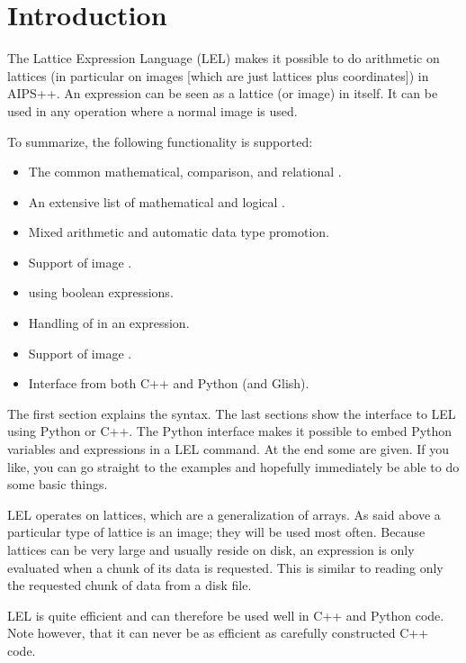 \section{Introduction}

The Lattice Expression Language (LEL) makes it possible to do arithmetic
on lattices (in particular on images [which are just lattices plus
coordinates]) in AIPS++.  An expression can be seen as a lattice (or
image) in itself.  It can be used in any operation where a normal image
is used. 

To summarize, the following functionality is supported:
\begin{itemize}
\item The common mathematical, comparison, and relational
      .
\item An extensive list of mathematical and logical
      .
\item Mixed  arithmetic
      and automatic data type promotion.
\item Support of image .
\item {} using boolean expressions.
\item Handling of  in an expression.
\item Support of image .
\item Interface from both C++ and Python (and Glish).
\end{itemize}

The first section explains the syntax.  The last sections show the
interface to LEL using Python or C++.  The Python interface makes it
possible to embed Python variables and expressions in a LEL command. 
At the end some  are given.  If 
you like, you can go straight to the examples and hopefully immediately
be able to do some basic things.

\medskip\noindent LEL operates on lattices, which are a generalization
of arrays.  As said above a particular type of lattice is an image; they
will be used most often.  Because lattices can be very large and
usually reside on disk, an
expression is only evaluated when a chunk of its data is requested. 
This is similar to reading only the requested chunk of data from a disk
file. 

\medskip\noindent LEL is quite efficient and can therefore be used well
in C++ and Python code.  Note however, that it can never be as efficient as
carefully constructed C++ code. 

